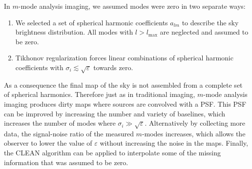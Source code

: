\documentclass[twocolumn]{aastex61}
\begin{document}
In $m$-mode analysis imaging, we assumed modes were zero in two separate ways:
\begin{enumerate}
    \item We selected a set of spherical harmonic coefficients $a_{lm}$ to describe the sky
        brightness distribution. All modes with $l>l_\text{max}$ are neglected and assumed to be
        zero.
    \item Tikhonov regularization forces linear combinations of spherical harmonic coefficients with
        $\sigma_i \lesssim \sqrt{\varepsilon}$ towards zero.
\end{enumerate}
As a consequence the final map of the sky is not assembled from a complete set of spherical
harmonics. Therefore just as in traditional imaging, $m$-mode analysis imaging produces dirty maps
where sources are convolved with a PSF.  This PSF can be improved by increasing the number and
variety of baselines, which increases the number of modes where $\sigma_i \gg \sqrt{\varepsilon}$.
Alternatively by collecting more data, the signal-noise ratio of the measured $m$-modes increases,
which allows the observer to lower the value of $\varepsilon$ without increasing the noise in the
maps.  Finally, the CLEAN algorithm can be applied to interpolate some of the missing information
that was assumed to be zero.
\end{document}
